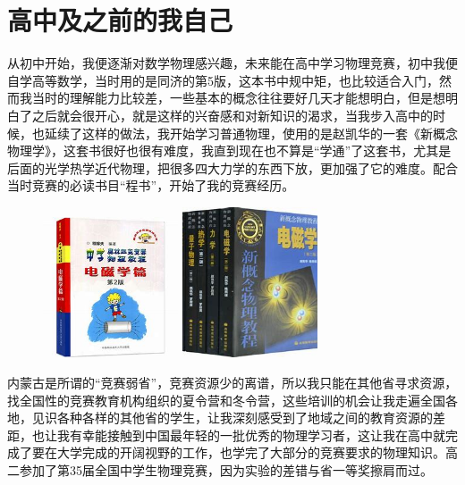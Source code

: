\documentclass[hyperref,UTF8]{ctexart}
\begin{document}
\section{高中及之前的我自己}
从初中开始，我便逐渐对数学物理感兴趣，未来能在高中学习物理竞赛，初中我便自学高等数学，当时用的是同济的第5版，这本书中规中矩，也比较适合入门，然而我当时的理解能力比较差，一些基本的概念往往要好几天才能想明白，但是想明白了之后就会很开心，就是这样的兴奋感和对新知识的渴求，当我步入高中的时候，也延续了这样的做法，我开始学习普通物理，使用的是赵凯华的一套《新概念物理学》，这套书很好也很有难度，我直到现在也不算是“学通”了这套书，尤其是后面的光学热学近代物理，把很多四大力学的东西下放，更加强了它的难度。配合当时竞赛的必读书目“程书”，开始了我的竞赛经历。
\begin{figure}[H]
    \centering
    \includegraphics[width=4cm]{程书.jpg}
    \includegraphics[width=4cm]{新概念.jpg}
\end{figure}
内蒙古是所谓的“竞赛弱省”，竞赛资源少的离谱，所以我只能在其他省寻求资源，找全国性的竞赛教育机构组织的夏令营和冬令营，这些培训的机会让我走遍全国各地，见识各种各样的其他省的学生，让我深刻感受到了地域之间的教育资源的差距，也让我有幸能接触到中国最年轻的一批优秀的物理学习者，这让我在高中就完成了要在大学完成的开阔视野的工作，也学完了大部分的竞赛要求的物理知识。高二参加了第35届全国中学生物理竞赛，因为实验的差错与省一等奖擦肩而过。
\end{document}
